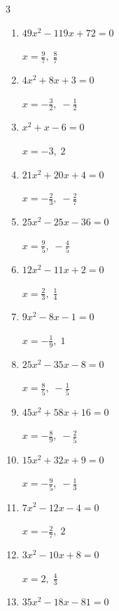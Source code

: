 \begin{multicols}{3}
\begin{enumerate}
\columnbreak %

\resetques

  \item $49x^{2}-119x+72=0$

        $\displaystyle x=\frac{9}{7},\; \frac{8}{7}$

  \item $4x^{2}+8x+3=0$

        $\displaystyle x=-\frac{3}{2},\; -\frac{1}{2}$

  \item $x^{2}+x-6=0$

        $\displaystyle x=-3,\; 2$

  \item $21x^{2}+20x+4=0$

        $\displaystyle x=-\frac{2}{3},\; -\frac{2}{7}$

  \item $25x^{2}-25x-36=0$

        $\displaystyle x=\frac{9}{5},\; -\frac{4}{5}$

  \item $12x^{2}-11x+2=0$

        $\displaystyle x=\frac{2}{3},\; \frac{1}{4}$

  \item $9x^{2}-8x-1=0$

        $\displaystyle x=-\frac{1}{9},\; 1$

  \item $25x^{2}-35x-8=0$

        $\displaystyle x=\frac{8}{5},\; -\frac{1}{5}$

  \item $45x^{2}+58x+16=0$

        $\displaystyle x=-\frac{8}{9},\; -\frac{2}{5}$

  \item $15x^{2}+32x+9=0$

        $\displaystyle x=-\frac{9}{5},\; -\frac{1}{3}$

\columnbreak %

  \item $7x^{2}-12x-4=0$

        $\displaystyle x=-\frac{2}{7},\; 2$

  \item $3x^{2}-10x+8=0$

        $\displaystyle x=2,\; \frac{4}{3}$

  \item $35x^{2}-18x-81=0$


\end{enumerate}
\end{multicols}
